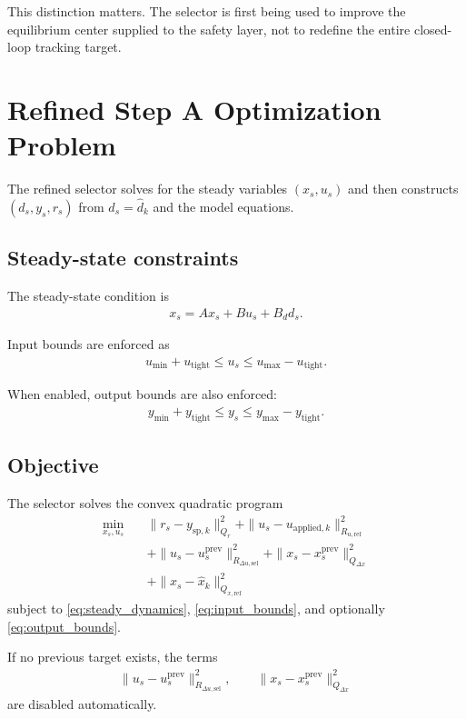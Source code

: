 \documentclass[11pt]{article}
\begin{document}
This distinction matters. The selector is first being used to improve the equilibrium center supplied to the safety layer, not to redefine the entire closed-loop tracking target.

\section{Refined Step A Optimization Problem}
The refined selector solves for the steady variables $(x_s,u_s)$ and then constructs $(d_s,y_s,r_s)$ from $d_s=\hat d_k$ and the model equations.

\subsection{Steady-state constraints}
The steady-state condition is
\begin{align}
x_s = A x_s + B u_s + B_d d_s.
\label{eq:steady_dynamics}
\end{align}

Input bounds are enforced as
\begin{align}
u_{\min} + u_{\mathrm{tight}}
\le u_s \le
u_{\max} - u_{\mathrm{tight}}.
\label{eq:input_bounds}
\end{align}

When enabled, output bounds are also enforced:
\begin{align}
y_{\min} + y_{\mathrm{tight}}
\le y_s \le
y_{\max} - y_{\mathrm{tight}}.
\label{eq:output_bounds}
\end{align}

\subsection{Objective}
The selector solves the convex quadratic program
\begin{align}
\min_{x_s,u_s}\quad
&
\|r_s - y_{\mathrm{sp},k}\|_{Q_r}^2
+
\|u_s - u_{\mathrm{applied},k}\|_{R_{u,\mathrm{ref}}}^2
\nonumber\\
&+
\|u_s - u_s^{\mathrm{prev}}\|_{R_{\Delta u,\mathrm{sel}}}^2
+
\|x_s - x_s^{\mathrm{prev}}\|_{Q_{\Delta x}}^2
\nonumber\\
&+
\|x_s - \hat x_k\|_{Q_{x,\mathrm{ref}}}^2
\label{eq:refined_selector_objective}
\end{align}
subject to \eqref{eq:steady_dynamics}, \eqref{eq:input_bounds}, and optionally \eqref{eq:output_bounds}.

If no previous target exists, the terms
\begin{align}
\|u_s - u_s^{\mathrm{prev}}\|_{R_{\Delta u,\mathrm{sel}}}^2,
\qquad
\|x_s - x_s^{\mathrm{prev}}\|_{Q_{\Delta x}}^2
\end{align}
are disabled automatically.
\end{document}
